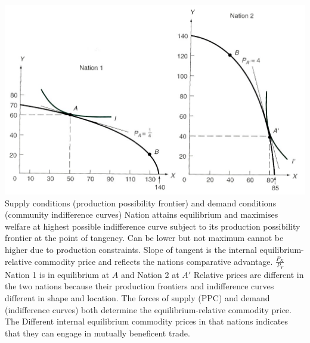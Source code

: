 \documentclass[12pt]{examnotes}
\begin{document}
\includegraphics[scale=0.4]{./imgs/34.jpg}
\ra Supply conditions (production possibility frontier) and demand conditions (community indifference curves)
\ra Nation attains equilibrium and maximises welfare at highest possible indifference curve subject to its production possibility frontier at the point of tangency. Can be lower but not maximum cannot be higher due to production constraints.
\ra Slope of tangent is the internal equilibrium-relative commodity price and reflects the nations comparative advantage. $\frac{P_X}{P_Y}$
\ra Nation 1 is in equilibrium at $A$ and Nation 2 at $A \prime$
\ra Relative prices are different in the two nations because their production frontiers and indifference curves different in shape and location.
\ra The forces of supply (PPC) and demand (indifference curves) both determine the equilibrium-relative commodity price.
\ra The Different internal equilibrium commodity prices in that nations indicates that they can engage in mutually beneficent trade.
\end{document}
